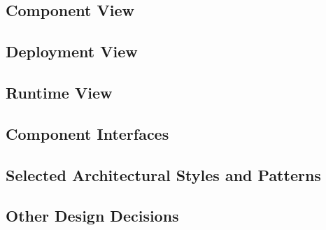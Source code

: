 \subsection{Component View}




\subsection{Deployment View}






\subsection{Runtime View}




\subsection{Component Interfaces}



\subsection{Selected Architectural Styles and Patterns}




\subsection{Other Design Decisions}


